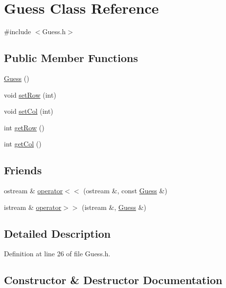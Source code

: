 \hypertarget{class_guess}{}\section{Guess Class Reference}
\label{class_guess}


{\ttfamily \#include $<$Guess.\+h$>$}

\subsection*{Public Member Functions}
\begin{DoxyCompactItemize}
\item 
\hyperlink{class_guess_a34ed64834f2bdb9a6198ec6e5e7bdfc0}{Guess} ()
\item 
void \hyperlink{class_guess_a14824d1a22b6d0cb328adf5b052b9529}{set\+Row} (int)
\item 
void \hyperlink{class_guess_a2283979520b0e7d4922241aa92f0917b}{set\+Col} (int)
\item 
int \hyperlink{class_guess_a9310375abd6a91897d51e0c78eb2d7c7}{get\+Row} ()
\item 
int \hyperlink{class_guess_ad8d68e38d81479d605977331a0e57a0a}{get\+Col} ()
\end{DoxyCompactItemize}
\subsection*{Friends}
\begin{DoxyCompactItemize}
\item 
ostream \& \hyperlink{class_guess_aa9dfccdd4605cf8faa55ddfa8d2c9745}{operator$<$$<$} (ostream \&, const \hyperlink{class_guess}{Guess} \&)
\item 
istream \& \hyperlink{class_guess_a4248aa595b925941de244395ba77ba7c}{operator$>$$>$} (istream \&, \hyperlink{class_guess}{Guess} \&)
\end{DoxyCompactItemize}


\subsection{Detailed Description}


Definition at line 26 of file Guess.\+h.



\subsection{Constructor \& Destructor Documentation}
\mbox{\label{class_guess_a34ed64834f2bdb9a6198ec6e5e7bdfc0}} 
